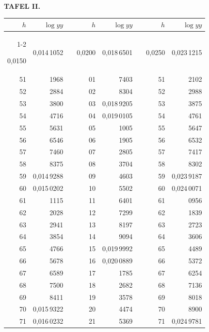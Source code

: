 \endgroup
{}
\clearpage
{}
\begingroup
\centering
\fontsize{9}{9}\selectfont
\setlength{\tabcolsep}{8pt}
\renewcommand{\arraystretch}{1}
\setlength{\parskip}{0pt}
\textbf{TAFEL II.}
\par\vspace{7pt}
\begin{tabular}{|r|r|@{}p{9pt}@{}|r|r|@{}p{9pt}@{}|r|r|}
\hline
\rule{0pt}{8.5pt}\(h\) & \(\log yy\) & & \(h\) & \(\log yy\) & & \(h\) & \(\log yy\) \\
\cline{1-2}\cline{4-5}\cline{7-8}
\rule{0pt}{8.5pt}0,0150 & 0,014\,1052 &  & 0,0200 & 0,018\,6501 &  & 0,0250 & 0,023\,1215 \\
51 & 1968 &  & 01 & 7403 &  & 51 & 2102 \\
52 & 2884 &  & 02 & 8304 &  & 52 & 2988 \\
53 & 3800 &  & 03 & 0,018\,9205 &  & 53 & 3875 \\
54 & 4716 &  & 04 & 0,019\,0105 &  & 54 & 4761 \\
55 & 5631 &  & 05 & 1005 &  & 55 & 5647 \\[3pt]
56 & 6546 &  & 06 & 1905 &  & 56 & 6532 \\
57 & 7460 &  & 07 & 2805 &  & 57 & 7417 \\
58 & 8375 &  & 08 & 3704 &  & 58 & 8302 \\
59 & 0,014\,9288 &  & 09 & 4603 &  & 59 & 0,023\,9187 \\
60 & 0,015\,0202 &  & 10 & 5502 &  & 60 & 0,024\,0071 \\[3pt]
61 & 1115 &  & 11 & 6401 &  & 61 & 0956 \\
62 & 2028 &  & 12 & 7299 &  & 62 & 1839 \\
63 & 2941 &  & 13 & 8197 &  & 63 & 2723 \\
64 & 3854 &  & 14 & 9094 &  & 64 & 3606 \\
65 & 4766 &  & 15 & 0,019\,9992 &  & 65 & 4489 \\[3pt]
66 & 5678 &  & 16 & 0,020\,0889 &  & 66 & 5372 \\
67 & 6589 &  & 17 & 1785 &  & 67 & 6254 \\
68 & 7500 &  & 18 & 2682 &  & 68 & 7136 \\
69 & 8411 &  & 19 & 3578 &  & 69 & 8018 \\
70 & 0,015\,9322 &  & 20 & 4474 &  & 70 & 8900 \\[3pt]
71 & 0,016\,0232 &  & 21 & 5369 &  & 71 & 0,024\,9781 \\

\end{tabular}
